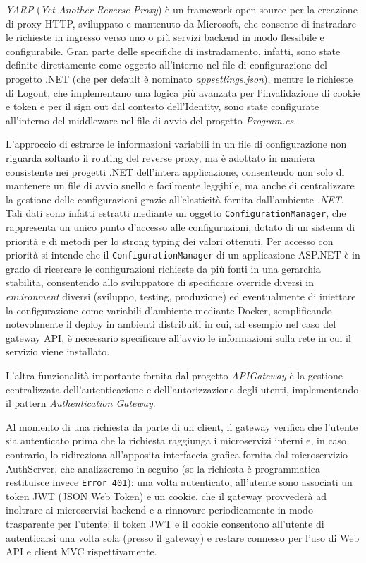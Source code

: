 \emph{YARP} (\emph{Yet Another Reverse Proxy}) è un framework open-source per la creazione di proxy HTTP, sviluppato e mantenuto da Microsoft, che consente di instradare le richieste in ingresso verso uno o più servizi backend in modo flessibile e configurabile. Gran parte delle specifiche di instradamento, infatti, sono state definite direttamente come oggetto all'interno nel file di configurazione del progetto .NET (che per default è nominato \emph{appsettings.json}), mentre le richieste di Logout, che implementano una logica più avanzata per l'invalidazione di cookie e token e per il sign out dal contesto dell'Identity, sono state configurate all'interno del middleware nel file di avvio del progetto \emph{Program.cs}.

L'approccio di estrarre le informazioni variabili in un file di configurazione non riguarda soltanto il routing del reverse proxy, ma è adottato in maniera consistente nei progetti .NET dell'intera applicazione, consentendo non solo di mantenere un file di avvio snello e facilmente leggibile, ma anche di centralizzare la gestione delle configurazioni grazie all'elasticità fornita dall'ambiente \emph{.NET}.
Tali dati sono infatti estratti mediante un oggetto \texttt{ConfigurationManager}, che rappresenta un unico punto d'accesso alle configurazioni, dotato di un sistema di priorità e di metodi per lo strong typing dei valori ottenuti. Per accesso con priorità si intende che il \texttt{ConfigurationManager} di un applicazione ASP.NET è in grado di ricercare le configurazioni richieste da più fonti in una gerarchia stabilita, consentendo allo sviluppatore di specificare override diversi in \emph{environment} diversi (sviluppo, testing, produzione) ed eventualmente di iniettare la configurazione come variabili d'ambiente mediante Docker, semplificando notevolmente il deploy in ambienti distribuiti in cui, ad esempio nel caso del gateway API, è necessario specificare all'avvio le informazioni sulla rete in cui il servizio viene installato.

L'altra funzionalità importante fornita dal progetto \emph{APIGateway} è la gestione centralizzata dell'autenticazione e dell'autorizzazione degli utenti, implementando il pattern \emph{Authentication Gateway}.

Al momento di una richiesta da parte di un client, il gateway verifica che l'utente sia autenticato prima che la richiesta raggiunga i microservizi interni e, in caso contrario, lo ridireziona all'apposita interfaccia grafica fornita dal microservizio AuthServer, che analizzeremo in seguito (se la richiesta è programmatica restituisce invece \texttt{Error 401}): una volta autenticato, all'utente sono associati un token JWT (JSON Web Token) e un cookie, che il gateway provvederà ad inoltrare ai microservizi backend e a rinnovare periodicamente in modo trasparente per l'utente: il token JWT e il cookie consentono all'utente di autenticarsi una volta sola (presso il gateway) e restare connesso per l'uso di Web API e client MVC rispettivamente.

